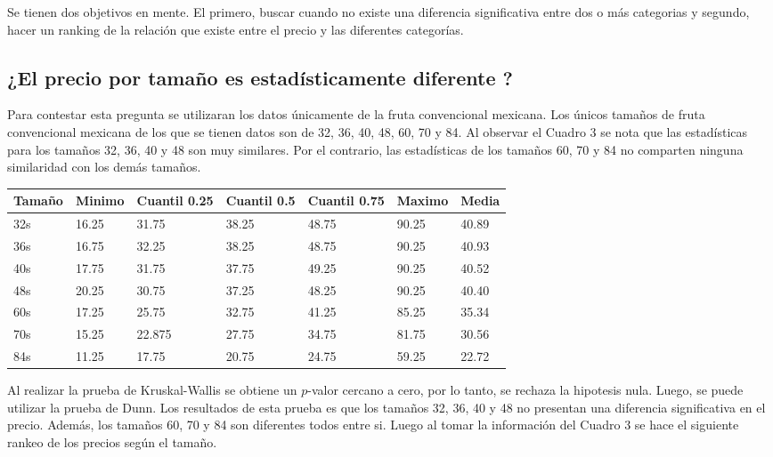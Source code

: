\documentclass{article}
\begin{document}
Se tienen dos objetivos en mente. El primero, buscar cuando no existe una diferencia significativa entre dos o más categorias y segundo, hacer un ranking de la relación que existe entre el precio y las diferentes categorías. 

\subsection*{¿El precio por tamaño es estadísticamente diferente ?}
Para contestar esta pregunta se utilizaran los datos únicamente de la fruta convencional mexicana. Los únicos tamaños de fruta convencional mexicana de los que se tienen datos son de 32, 36, 40, 48, 60, 70 y 84. Al observar el Cuadro 3 se nota que las estadísticas para los tamaños 32, 36, 40 y 48 son muy similares. Por el contrario, las estadísticas de los tamaños 60, 70 y 84 no comparten ninguna similaridad con los demás tamaños.

\begin{center}
\begin{tabular}{|l|l|l|l|l|l|l|}
\hline
		Tamaño & Minimo & Cuantil 0.25 & Cuantil 0.5 & Cuantil 0.75 & Maximo & Media \\ \hline
		 32s & 16.25 & 31.75 & 38.25 & 48.75 & 90.25 & 40.89\\ \hline
 36s & 16.75 & 32.25 & 38.25 & 48.75 & 90.25 & 40.93\\ \hline
 40s & 17.75 & 31.75 & 37.75 & 49.25 & 90.25 & 40.52\\ \hline
 48s & 20.25 & 30.75 & 37.25 & 48.25 & 90.25 & 40.40\\ \hline
 60s & 17.25 & 25.75 & 32.75 & 41.25 & 85.25 & 35.34\\ \hline
 70s & 15.25 & 22.875 & 27.75 & 34.75 & 81.75 & 30.56\\ \hline
 84s & 11.25 & 17.75 & 20.75 & 24.75 & 59.25 & 22.72\\ \hline
\end{tabular}
\end{center}
Al realizar la prueba de Kruskal-Wallis  se obtiene un $p$-valor cercano a cero, por lo tanto, se rechaza la hipotesis nula. Luego, se puede utilizar la prueba de Dunn. Los resultados de esta prueba es que los tamaños 32, 36, 40 y 48 no presentan una diferencia significativa en el precio. Además, los tamaños 60, 70 y 84 son diferentes todos entre si. Luego al tomar la información del Cuadro 3 se hace el siguiente rankeo de los precios según el tamaño.
\end{document}
